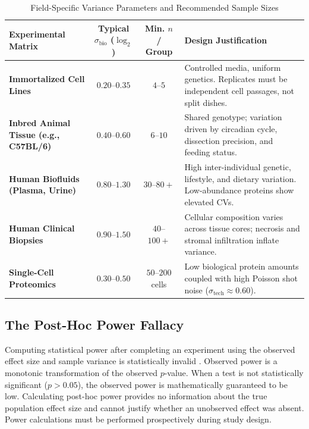 \documentclass[11pt,twoside,openright]{book}
\begin{document}
\begin{table}[ht]
\centering
\caption{Field-Specific Variance Parameters and Recommended Sample Sizes}
\label{tab:field_guidelines}
\small
\begin{tabularx}{\textwidth}{l c c X}
\toprule
\textbf{Experimental Matrix} & \textbf{Typical $\sigma_{\text{bio}}$ ($\log_2$)} & \textbf{Min. $n$ / Group} & \textbf{Design Justification} \\
\midrule
\textbf{Immortalized Cell Lines} & $0.20$--$0.35$ & $4$--$5$ & Controlled media, uniform genetics. Replicates must be independent cell passages, not split dishes. \\
\addlinespace
\textbf{Inbred Animal Tissue (e.g., C57BL/6)} & $0.40$--$0.60$ & $6$--$10$ & Shared genotype; variation driven by circadian cycle, dissection precision, and feeding status. \\
\addlinespace
\textbf{Human Biofluids (Plasma, Urine)} & $0.80$--$1.30$ & $30$--$80+$ & High inter-individual genetic, lifestyle, and dietary variation. Low-abundance proteins show elevated CVs. \\
\addlinespace
\textbf{Human Clinical Biopsies} & $0.90$--$1.50$ & $40$--$100+$ & Cellular composition varies across tissue cores; necrosis and stromal infiltration inflate variance. \\
\addlinespace
\textbf{Single-Cell Proteomics} & $0.30$--$0.50$ & $50$--$200$ cells & Low biological protein amounts coupled with high Poisson shot noise ($\sigma_{\text{tech}} \approx 0.60$). \\
\bottomrule
\end{tabularx}
\end{table}

\subsection{The Post-Hoc Power Fallacy}

Computing statistical power after completing an experiment using the observed effect size and sample variance is statistically invalid \cite{hoenig2001abuse}. Observed power is a monotonic transformation of the observed $p$-value. When a test is not statistically significant ($p > 0.05$), the observed power is mathematically guaranteed to be low. Calculating post-hoc power provides no information about the true population effect size and cannot justify whether an unobserved effect was absent. Power calculations must be performed prospectively during study design.
\end{document}
